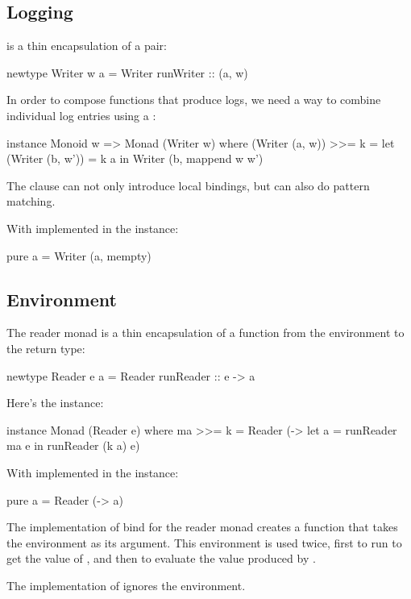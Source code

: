 \documentclass[DaoFP]{subfiles}
\begin{document}
\subsection{Logging}
 is a thin encapsulation of a pair:
\begin{haskell}
newtype Writer w a = Writer { runWriter :: (a, w) }
\end{haskell}

In order to compose functions that produce logs, we need a way to combine individual log entries using a :
\begin{haskell}
instance Monoid w => Monad (Writer w) where
  (Writer (a, w)) >>= k = let (Writer (b, w')) = k a
                          in Writer (b, mappend w w')
\end{haskell}
The  clause can not only introduce local bindings, but can also do pattern matching.

With  implemented in the  instance:
\begin{haskell}
  pure a = Writer (a, mempty)
\end{haskell}

\subsection{Environment}

The reader monad is a thin encapsulation of a function from the environment to the return type:
\begin{haskell}
newtype Reader e a = Reader { runReader :: e -> a }
\end{haskell}
Here's the  instance:
\begin{haskell}
instance Monad (Reader e) where
  ma >>= k = Reader (\e -> let a = runReader ma e
                           in runReader (k a) e)
\end{haskell}

With  implemented in the  instance:
\begin{haskell}
  pure a = Reader (\e -> a)
\end{haskell}
The implementation of bind for the reader monad creates a function that takes the environment as its argument. This environment is used twice, first to run  to get the value of , and then to evaluate the value produced by .

The implementation of  ignores the environment.
\end{document}
